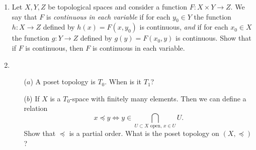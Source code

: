 \begin{enumerate}[label=1.\arabic*]
  
  \item Let $X,Y,Z$ be topological spaces and consider a function $F:X\times Y\rightarrow Z$. We say that $F$ is \emph{continuous in each variable} if for each $y_0\in Y$ the function $h:X\rightarrow Z$ defined by $h(x)=F(x,y_0)$ is continuous, \emph{and} if for each $x_0\in X$ the function $g:Y\rightarrow Z$ defined by $g(y) = F(x_0,y)$ is continuous. Show that if $F$ is continuous, then $F$ is continuous in each variable.
  
  \item \begin{itemize}
		\item[($a$)] A poset topology is $T_0$. When is it $T_1$?
		\item[($b$)] If $X$ is a $T_0$-space with finitely many elements. Then we can define a relation
		\[x\preceq y \Leftrightarrow y\in \bigcap_{U\subset X\text{ open}, \,x\in U} U.\]
		Show that $\preceq$ is a partial order. What is the poset topology on $(X,\preceq)$?
	\end{itemize}
\end{enumerate}

